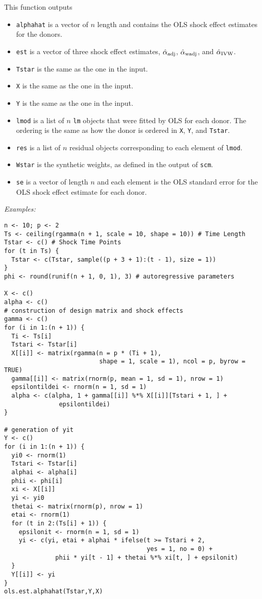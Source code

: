 \documentclass[12pt]{article}
\begin{document}
 This function outputs
 \begin{itemize}
 	\item \texttt{alphahat} is a vector of $n$ length and contains the OLS shock effect estimates for the donors.
 	\item \texttt{est} is a vector of three shock effect estimates, $\hat{\alpha}_{\rm adj}$, $\hat{\alpha}_{\rm wadj}$, and $\hat{\alpha}_{\rm IVW}$.
 	\item \texttt{Tstar} is the same as the one in the input.
 	\item \texttt{X} is the same as the one in the input.
 	\item \texttt{Y} is the same as the one in the input.
 	\item \texttt{lmod} is a list of $n$ \texttt{lm} objects that were fitted by OLS for each donor. The ordering is the same as how the donor is ordered in \texttt{X}, \texttt{Y}, and \texttt{Tstar}.
 	\item \texttt{res} is a list of $n$ residual objects corresponding to each element of  \texttt{lmod}.
 	\item \texttt{Wstar} is the synthetic weights, as defined in the output of \texttt{scm}.
 	\item \texttt{se} is a vector of length $n$ and each element is the OLS standard error for the OLS shock effect estimate for each donor.
 \end{itemize}
 
 \emph{Examples:}
 
 \begin{verbatim}
n <- 10; p <- 2
Ts <- ceiling(rgamma(n + 1, scale = 10, shape = 10)) # Time Length
Tstar <- c() # Shock Time Points
for (t in Ts) {
  Tstar <- c(Tstar, sample((p + 3 + 1):(t - 1), size = 1))
}
phi <- round(runif(n + 1, 0, 1), 3) # autoregressive parameters

X <- c()
alpha <- c()
# construction of design matrix and shock effects
gamma <- c()
for (i in 1:(n + 1)) {
  Ti <- Ts[i]
  Tstari <- Tstar[i]
  X[[i]] <- matrix(rgamma(n = p * (Ti + 1),
                          shape = 1, scale = 1), ncol = p, byrow = TRUE) 
  gamma[[i]] <- matrix(rnorm(p, mean = 1, sd = 1), nrow = 1)
  epsilontildei <- rnorm(n = 1, sd = 1)
  alpha <- c(alpha, 1 + gamma[[i]] %*% X[[i]][Tstari + 1, ] +
               epsilontildei)
}

# generation of yit
Y <- c()
for (i in 1:(n + 1)) {
  yi0 <- rnorm(1)
  Tstari <- Tstar[i]
  alphai <- alpha[i]
  phii <- phi[i]
  xi <- X[[i]]
  yi <- yi0
  thetai <- matrix(rnorm(p), nrow = 1)
  etai <- rnorm(1)
  for (t in 2:(Ts[i] + 1)) {
    epsilonit <- rnorm(n = 1, sd = 1)
    yi <- c(yi, etai + alphai * ifelse(t >= Tstari + 2, 
                                       yes = 1, no = 0) +
              phii * yi[t - 1] + thetai %*% xi[t, ] + epsilonit)
  }
  Y[[i]] <- yi
}
ols.est.alphahat(Tstar,Y,X)
 \end{verbatim}
 
\end{document}
